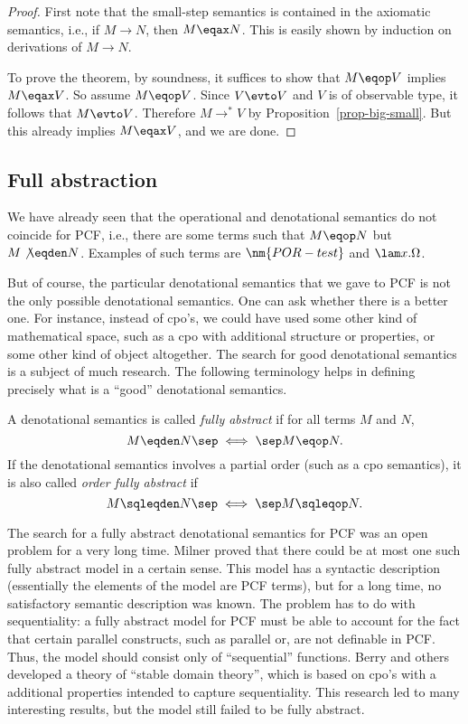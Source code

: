 \documentclass[12pt]{article}
\begin{document}
\begin{proof}
  First note that the small-step semantics is contained in the
  axiomatic semantics, i.e., if $M\to N$, then $M\eqax N$. This is
  easily shown by induction on derivations of $M\to N$. 
  
  To prove the theorem, by soundness, it suffices to show that $M\eqop
  V$ implies $M\eqax V$. So assume $M\eqop V$. Since $V\evto V$ and
  $V$ is of observable type, it follows that $M\evto V$. Therefore
  $M\to^* V$ by Proposition~\ref{prop-big-small}. But this already
  implies $M\eqax V$, and we are done.\eot
\end{proof}

\subsection{Full abstraction}

We have already seen that the operational and denotational semantics
do not coincide for PCF, i.e., there are some terms such that $M\eqop
N$ but $M\not\eqden N$. Examples of such terms are $\nm{POR-test}$ and
$\lam x.\Omega$. 

But of course, the particular denotational semantics that we gave to
PCF is not the only possible denotational semantics. One can ask
whether there is a better one. For instance, instead of cpo's, we
could have used some other kind of mathematical space, such as a cpo
with additional structure or properties, or some other kind of object
altogether. The search for good denotational semantics is a subject of
much research. The following terminology helps in defining precisely
what is a ``good'' denotational semantics.

\begin{definition}
  A denotational semantics is called {\em fully abstract} if for all
  terms $M$ and $N$,
  \[        M\eqden N  \sep\iff\sep   M\eqop N.
  \]
  If the denotational semantics involves a partial order (such as a
  cpo semantics), it is also called {\em order fully abstract} if
  \[        M\sqleqden N   \sep\iff\sep    M\sqleqop N.
  \]
\end{definition}

\vspace{-.1ex}

The search for a fully abstract denotational semantics for PCF was an
open problem for a very long time. Milner proved that there could be
at most one such fully abstract model in a certain sense. This model
has a syntactic description (essentially the elements of the model are
PCF terms), but for a long time, no satisfactory semantic description
was known. The problem has to do with sequentiality: a fully abstract
model for PCF must be able to account for the fact that certain
parallel constructs, such as parallel or, are not definable in PCF.
Thus, the model should consist only of ``sequential'' functions. Berry
and others developed a theory of ``stable domain theory'', which is
based on cpo's with a additional properties intended to capture
sequentiality. This research led to many interesting results, but the
model still failed to be fully abstract. 
\end{document}
